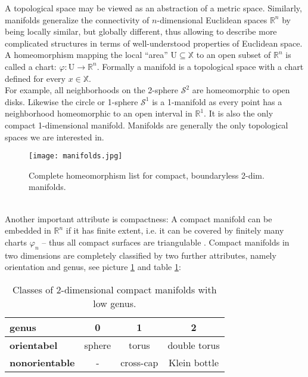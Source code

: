A topological space may be viewed as an abstraction of a metric space.
Similarly, manifolds generalize the connectivity of $n$-dimensional Euclidean spaces $\mathbb{R}^{n}$ by being locally similar, but globally different, thus allowing to describe more complicated structures in terms of well-understood properties of Euclidean space.
A homeomorphism mapping the local ``area'' $\mathrm{U} \subseteq \mathbb{X}$ to an open subset of $\mathbb{R}^{n}$ is called a chart: $\varphi : \mathrm{U} \rightarrow \mathbb{R}^{n}$.
Formally a manifold is a topological space with a chart defined for every $x \in \mathbb{X}$.\\
For example, all neighborhoods on the 2-sphere $\mathcal{S}^{2}$ are homeomorphic to open disks.
Likewise the circle or 1-sphere $\mathcal{S}^{1}$ is a 1-manifold as every point has a neighborhood homeomorphic to an open interval in $\mathbb{R}^{1}$.
It is also the only compact 1-dimensional manifold.
Manifolds are generally the only topological spaces we are interested in.
\begin{figure}[ht]
\centering
\texttt{[image: manifolds.jpg]}
\caption{Complete homeomorphism list for compact, boundaryless 2-dim. manifolds.}
\label{fig:manifolds}
\end{figure}\\
Another important attribute is compactness: A compact manifold can be embedded in $\mathbb{R}^{n}$ if it has finite extent, i.e. it can be covered by finitely many charts $\varphi_{n}$ -- thus all compact surfaces are triangulable \citep[which was first shown by][]{Rado1925}.
Compact manifolds in two dimensions are completely classified by two further attributes, namely orientation and genus, see picture \ref{fig:manifolds} and table \ref{tab:manifolds}:
\begin{table}[hbt]
\medskip
\setlength{\tabcolsep}{15pt}
\renewcommand{\arraystretch}{1.0}
   \centering
\begin{tabular}{ l || c | c | c } \centering
	\textbf{genus}		& 0			& 1				& 2 \\ \hline \hline
	\textbf{orientabel}	& sphere		& torus 			& double torus \\ \hline
	\textbf{nonorientable}	& -			& cross-cap		& Klein bottle \\
\end{tabular}
   \medskip
   \caption{Classes of 2-dimensional compact manifolds with low genus.}
   \label{tab:manifolds}
\end{table}\\
